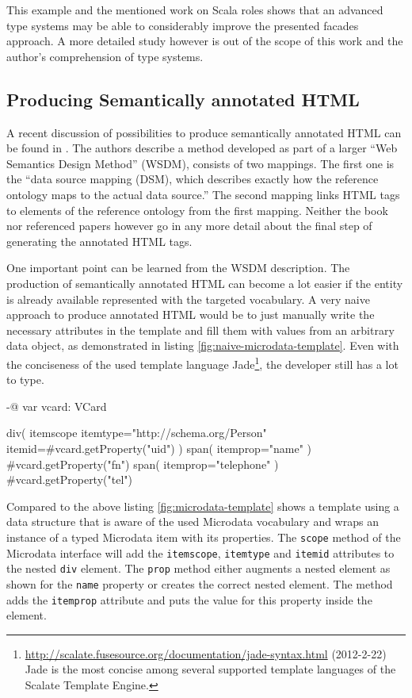 \documentclass[12pt,a4paper]{scrartcl}		%
\newcommand{\citeurl}[2]{\url{#1} (#2)}
\begin{document}
This example and the mentioned work on Scala roles shows that an advanced type
systems may be able to considerably improve the presented facades approach. A
more detailed study however is out of the scope of this work and the author's
comprehension of type systems.


\subsection{Producing Semantically annotated HTML}

A recent discussion of possibilities to produce semantically annotated HTML can
be found in \cite[sec. 9.1.3]{DBLP:books/daglib/0023755}. The authors describe a
method developed as part of a larger ``Web Semantics Design Method'' (WSDM),
consists of two mappings. The first one is the ``data source mapping (DSM),
which describes exactly how the reference ontology maps to the actual data
source.''  The second mapping links HTML tags to elements of the reference
ontology from the first mapping. Neither the book nor referenced papers however
go in any more detail about the final step of generating the annotated HTML
tags.

One important point can be learned from the WSDM description. The production of
semantically annotated HTML can become a lot easier if the entity is already
available represented with the targeted vocabulary. A very naive approach to
produce annotated HTML would be to just manually write the necessary attributes
in the template and fill them with values from an arbitrary data object, as
demonstrated in listing \ref{fig:naive-microdata-template}. Even with the
conciseness of the used template language
Jade\footnote{\citeurl{http://scalate.fusesource.org/documentation/jade-syntax.html}{2012-2-22}
  Jade is the most concise among several supported template languages of the
  Scalate Template Engine.}, the developer still has a lot to type.

\begin{anylisting}[label=fig:naive-microdata-template,
                   caption={Defining all Microdata attributes manually in an HTML template}]
-@ var vcard: VCard

div( itemscope itemtype="http://schema.org/Person" 
     itemid=#{vcard.getProperty("uid")} )
  span( itemprop="name" )
    #{vcard.getProperty("fn")}
  span( itemprop="telephone" ) 
    #{vcard.getProperty("tel")}
\end{anylisting}

Compared to the above listing \ref{fig:microdata-template} shows a template
using a data structure that is aware of the used Microdata vocabulary and wraps
an instance of a typed Microdata item with its properties. The
\lstinline:scope: method of the Microdata interface will add the
\lstinline:itemscope:, \lstinline:itemtype: and \lstinline:itemid: attributes to
the nested \lstinline:div: element. The \lstinline:prop: method either augments
a nested element as shown for the \lstinline:name: property or creates the
correct nested element. The method adds the \lstinline:itemprop: attribute and
puts the value for this property inside the element.
\end{document}
